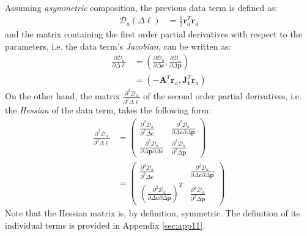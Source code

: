 Assuming \emph{asymmetric} composition, the previous data term is defined as:
\begin{equation}
    \begin{aligned}
		\mathcal{D}_a(\Delta \boldsymbol{\ell}) & = \frac{1}{2}\mathbf{r}_a^T \mathbf{r}_a
    \label{eq:asymmetric_data}
    \end{aligned}
\end{equation}
and the matrix containing the first order partial derivatives with respect to the parameters, i.e. the data term's \emph{Jacobian}, can be written as:
\begin{equation}
    \begin{aligned}
		\frac{\partial \mathcal{D}_a}{\partial \Delta \boldsymbol{\ell}} & = \left( \frac{\partial \mathcal{D}_a}{\partial \Delta \mathbf{c}}, \frac{\partial \mathcal{D}_a}{\partial \Delta \mathbf{p}} \right)
		\\
		& = \left( -\mathbf{A}^T \mathbf{r}_a, \mathbf{J}_{\mathbf{t}}^T \mathbf{r}_a \right)
    \label{eq:asymmetric_newton_jacobian}
    \end{aligned}
\end{equation}
On the other hand, the matrix $\frac{\partial^2 \mathcal{D}_a}{\partial^2 \Delta \boldsymbol{\ell}}$ of the second order partial derivatives, i.e. the \emph{Hessian} of the data term, takes the following form:
\begin{equation}
    \begin{aligned}
		\frac{\partial^2 \mathcal{D}_a}{\partial^2 \Delta \boldsymbol{\ell}} & =
		\begin{pmatrix}
			\frac{\partial^2 \mathcal{D}_a}{\partial^2 \Delta \mathbf{c}} & \frac{\partial^2 \mathcal{D}_a}{\partial \Delta \mathbf{c} \partial \Delta \mathbf{p}}
			\\
			\frac{\partial^2 \mathcal{D}_a}{\partial \Delta \mathbf{p} \partial \Delta \mathbf{c}} & \frac{\partial^2 \mathcal{D}_a}{\partial^2 \Delta \mathbf{p}}
		\end{pmatrix}
        \\
        & =
        \begin{pmatrix}
            \frac{\partial^2 \mathcal{D}_a}{\partial^2 \Delta \mathbf{c}} & \frac{\partial^2 \mathcal{D}_a}{\partial \Delta \mathbf{c} \partial \Delta \mathbf{p}}
            \\
            \left(\frac{\partial^2 \mathcal{D}_a}{\partial \Delta \mathbf{c} \partial \Delta \mathbf{p}}\right)^T & \frac{\partial^2 \mathcal{D}_a}{\partial^2 \Delta \mathbf{p}}
        \end{pmatrix}
    \label{eq:asymmetric_newton_hessian}
    \end{aligned}
\end{equation}
Note that the Hessian matrix is, by definition, symmetric. The definition of its individual terms is provided in Appendix \ref{sec:app11}.

